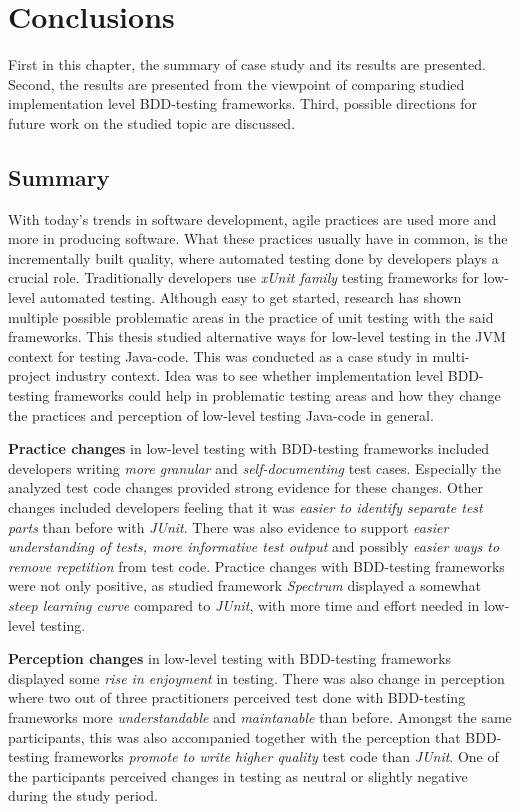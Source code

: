\chapter{Conclusions}
\label{chapter:conclusions}
First in this chapter, the summary of case study and its results are presented. Second, the results are presented
from the viewpoint of comparing studied implementation level BDD-testing frameworks. Third, possible directions for future work
on the studied topic are discussed.

\section{Summary}
With today's trends in software development, agile practices are used more and more in producing software. What these practices
usually have in common, is the incrementally built quality, where automated testing done by developers plays a crucial role.
Traditionally developers use \textit{xUnit family} testing frameworks for low-level automated testing. Although easy
to get started, research has shown multiple possible problematic areas in the practice of unit testing with the said
frameworks. This thesis studied alternative ways for low-level testing in the JVM context for testing Java-code.
This was conducted as a case study in multi-project industry context.
Idea was to see whether implementation level BDD-testing frameworks could help in problematic testing areas and how they
change the practices and perception of low-level testing Java-code in general.

\textbf{Practice changes} in low-level testing with BDD-testing frameworks included developers writing \textit{more granular}
and \textit{self-documenting} test cases. Especially the analyzed test code changes provided strong evidence for these changes.
Other changes included developers feeling that it was \textit{easier to identify separate test parts} than before with
\textit{JUnit}. There was also evidence to support \textit{easier understanding of tests, more informative test output} and
possibly \textit{easier ways to remove repetition} from test code. Practice changes with BDD-testing frameworks were not only
positive, as studied framework \textit{Spectrum} displayed a somewhat \textit{steep learning curve} compared to \textit{JUnit}, with more time
and effort needed in low-level testing.

\textbf{Perception changes} in low-level testing with BDD-testing frameworks displayed some \textit{rise in enjoyment} in testing.
There was also change in perception where two out of three practitioners perceived test done with BDD-testing frameworks
more \textit{understandable} and \textit{maintanable} than before. Amongst the same participants, this was also accompanied
together with the perception that BDD-testing frameworks \textit{promote to write higher quality} test code than \textit{JUnit}.
One of the participants perceived changes in testing as neutral or slightly negative during the study period.

